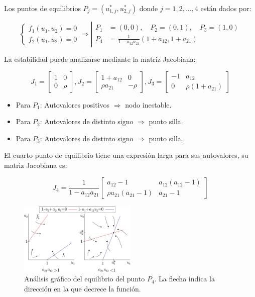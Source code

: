 \documentclass[twocolumn,aps,prl]{revtex4-1}
\begin{document}
Los puntos de equilibrios $P_j = (u^*_{1,j},u^*_{2,j})$ donde $j= 1, 2, ..., 4$ están dados por: 

$$
\left\{
\begin{aligned}
    f_1(u_1, u_2) = 0\\ 
    f_2(u_1, u_2) = 0
\end{aligned} \right. \Rightarrow
\left\lvert 
\begin{aligned}
    P_1 &= (0, 0), \quad P_2 = (0, 1), \quad P_3 = (1, 0) \\ 
    P_4 &= \frac{1}{1-a_{12} a_{21}}(1+a_{12}, 1+a_{21})
\end{aligned} \right.
$$

La estabilidad puede analizarse mediante la matriz Jacobiana:

$$
J_1 = \begin{bmatrix}
    1 & 0 \\
    0 & \rho 
\end{bmatrix}
,
J_2 = \begin{bmatrix}
    1 + a_{12} & 0 \\
     \rho a_{21} & - \rho 
\end{bmatrix}
,
J_3 = \begin{bmatrix}
    -1 & a_{12} \\
    0      & \rho \left( 1 + a_{21} \right)
\end{bmatrix}
$$

\begin{itemize}
    \item Para $P_1$: Autovalores positivos $\Rightarrow$ nodo inestable.
    \item Para $P_2$: Autovalores de distinto signo $\Rightarrow$ punto silla.
    \item Para $P_3$: Autovalores de distinto signo $\Rightarrow$ punto silla.
\end{itemize}

El cuarto punto de equilibrio tiene una expresión larga para sus autovalores, su matriz Jacobiana es:

$$
J_4 = 
\frac{1}{1-a_{12} a_{21}}
\begin{bmatrix}
    a_{12} - 1 & a_{12} (a_{12} - 1) \\
    \rho a_{21} (a_{21} - 1) & a_{21} - 1
\end{bmatrix}
$$


\begin{figure}
    \centering
    \includegraphics[width=0.5\textwidth]{figuras/equilibrio.pdf}
    \caption{Análisis gráfico del equilibrio del punto $P_4$. La flecha indica la dirección en la que decrece la función.}
    \label{fig:mosquitos}
\end{figure}
\end{document}
